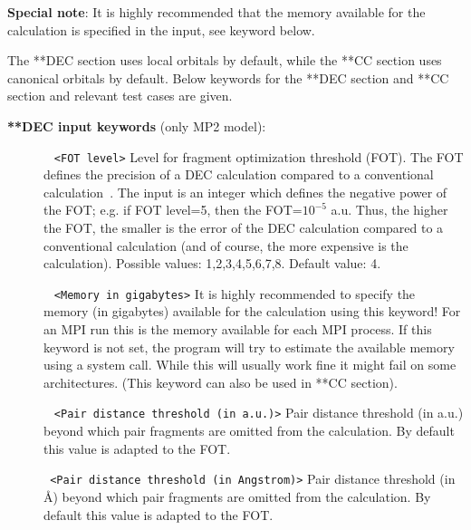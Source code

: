 \textbf{Special note}: It is highly recommended that the memory available for the calculation is specified in the input, see  keyword below.

The **DEC section uses local orbitals by default, while the **CC section uses canonical orbitals by default.
Below keywords for the **DEC section and **CC section and relevant test cases are given. 

\vspace{1 cm}
\noindent
\textbf{**DEC input keywords} (only MP2 model):

\begin{description}
\item[]\verb| | \newline
\verb|<FOT level>|\newline
Level for fragment optimization threshold (FOT). The FOT defines the precision of a DEC calculation compared
to a conventional calculation~\cite{dec1,dec2,dec3,dec4,dec5,dec6}.
The input is an integer which defines the negative power of the FOT; e.g. if FOT level=5, then the FOT=$10^{-5}$ a.u.
Thus, the higher the FOT, the smaller is the error of the DEC calculation compared to a conventional calculation (and of course, the more expensive is the calculation). Possible values: 1,2,3,4,5,6,7,8. Default value: 4.


\item[] \verb| | \newline
\verb|<Memory in gigabytes>| \newline
It is highly recommended to specify the memory (in gigabytes) available for the calculation using this keyword! For an MPI run this is the memory available for each MPI process.
If this keyword is not set, the program will try to estimate the available memory using a system call. While this will usually work fine it might fail on some architectures.
(This keyword can also be used in **CC section).


\item[] \verb| | \newline
\verb|<Pair distance threshold (in a.u.)>|\newline
Pair distance threshold (in a.u.) beyond which pair fragments are omitted from the calculation. By default this value is adapted to the FOT.

\item[]  \verb| | \newline
\verb|<Pair distance threshold (in Angstrom)>|\newline
Pair distance threshold (in {\AA}) beyond which pair fragments are omitted from the calculation. By default this value is adapted to the FOT.



\end{description}
